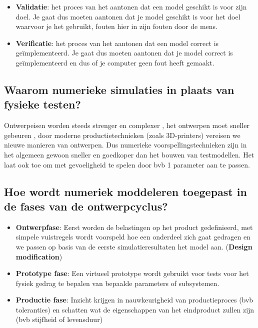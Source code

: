 \documentclass[a4paper,11pt,twoside]{report}
\begin{document}
\begin{itemize}
    \item \textbf{Validatie}: het proces van het aantonen dat een model geschikt is voor zijn doel.
          Je gaat dus moeten aantonen dat je model geschikt is voor het doel waarvoor je het gebruikt,
          fouten hier in zijn fouten door de mens.
    \item \textbf{Verificatie}: het proces van het aantonen dat een model correct is
          geïmplementeerd. Je gaat dus moeten aantonen dat je model correct is geïmplementeerd en dus of
          je computer geen fout heeft gemaakt.
\end{itemize}
\subsection{Waarom numerieke simulaties in plaats van fysieke testen?}
Ontwerpeisen worden steeds strenger en complexer , het ontwerpen moet sneller gebeuren , door
moderne productietechnieken (zoals 3D-printers) vereisen we nieuwe manieren van ontwerpen. Dus
numerieke voorspellingstechnieken zijn in het algemeen gewoon sneller en goedkoper dan het bouwen
van testmodellen. Het laat ook toe om met gevoeligheid te spelen door bvb 1 parameter aan te passen.
\newline
\subsection{Hoe wordt numeriek moddeleren toegepast in de fases van de ontwerpcyclus?}
\begin{itemize}
    \item \textbf{Ontwerpfase}: Eerst worden de belastingen op het product gedefinieerd, met simpele
          vuistregels wordt voorspeld hoe een onderdeel zich gaat gedragen en we passen op basis van de
          eerste simulatieresultaten het model aan. (\textbf{Design modification})
    \item \textbf{Prototype fase}: Een virtueel prototype wordt gebruikt voor tests voor het fysiek
          gedrag te bepalen van bepaalde parameters of subsystemen.
    \item \textbf{Productie fase}: Inzicht krijgen in nauwkeurigheid van productieproces (bvb
          toleranties) en schatten wat de eigenschappen van het eindproduct zullen zijn (bvb stijfheid of
          levensduur)
\end{itemize}
\newpage
\end{document}
